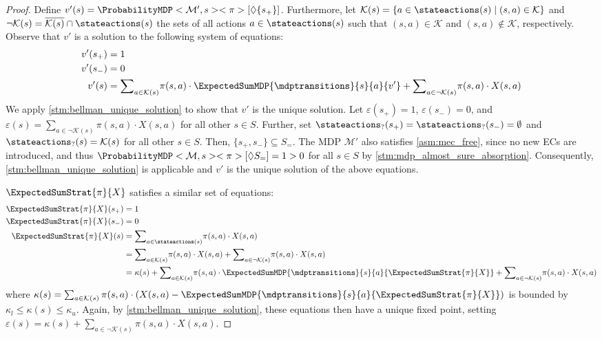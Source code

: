 \documentclass{theoretics}
\newcommand{\intersectionSym}{\cap}
\newcommand{\intersectionBin}{\mathbin{\intersectionSym}}
\newcommand{\intersection}{\intersectionBin}
\newcommand{\MDP}{\mathcal{M}}
\newcommand{\States}{S}
\newcommand{\strategy}{\pi}
\newcommand{\reach}{\Diamond}
\newcommand{\targetstate}{s_+}
\newcommand{\sinkstate}{s_-}
\begin{document}
\begin{proof}
	Define $v'(s) = \ProbabilityMDP<\MDP', s><\strategy>[\reach \{\targetstate\}]$.
	Furthermore, let $\mathcal{K}(s) = \{a \in \stateactions(s) \mid (s, a) \in \mathcal{K}\}$ and $\lnot \mathcal{K}(s) = \overline{\mathcal{K}(s)} \intersection \stateactions(s)$ the sets of all actions $a \in \stateactions(s)$ such that $(s, a) \in \mathcal{K}$ and $(s, a) \notin \mathcal{K}$, respectively.
	Observe that $v'$ is a solution to the following system of equations:
	\begin{align*}
		v'(\targetstate) & = 1 \\
		v'(\sinkstate) & = 0 \\
		v'(s) & = {\sum}_{a \in \mathcal{K}(s)} \strategy(s, a) \cdot \ExpectedSumMDP{\mdptransitions}{s}{a}{v'} + {\sum}_{a \in \lnot \mathcal{K}(s)} \strategy(s, a) \cdot X(s, a)
	\end{align*}
	We apply \cref{stm:bellman_unique_solution} to show that $v'$ is the unique solution.
	Let $\varepsilon(\targetstate) = 1$, $\varepsilon(\sinkstate) = 0$, and $\varepsilon(s) = {\sum}_{a \in \lnot \mathcal{K}(s)} \strategy(s, a) \cdot X(s, a)$ for all other $s \in \States$.
	Further, set $\stateactions_?(\targetstate) = \stateactions_?(\sinkstate) = \emptyset$ and $\stateactions_?(s) = \mathcal{K}(s)$ for all other $s \in \States$.
	Then, $\{\targetstate, \sinkstate\} \subseteq \States_=$.
	The MDP $\MDP'$ also satisfies \cref{asm:mec_free}, since no new ECs are introduced, and thus $\ProbabilityMDP<\MDP, s><\strategy>[\reach \States_=] = 1 > 0$ for all $s \in \States$ by \cref{stm:mdp_almost_sure_absorption}.
	Consequently, \cref{stm:bellman_unique_solution} is applicable and $v'$ is the unique solution of the above equations.

	$\ExpectedSumStrat{\strategy}{X}$ satisfies a similar set of equations:
	\begin{align*}
		\ExpectedSumStrat{\strategy}{X}(\targetstate) & = 1 \\
		\ExpectedSumStrat{\strategy}{X}(\sinkstate) & = 0 \\
		\ExpectedSumStrat{\strategy}{X}(s) & = {\sum}_{a \in \stateactions(s)} \strategy(s, a) \cdot X(s, a) \\
			& = {\sum}_{a \in \mathcal{K}(s)} \strategy(s, a) \cdot X(s, a) + {\sum}_{a \in \lnot \mathcal{K}(s)} \strategy(s, a) \cdot X(s, a) \\
			& = \kappa(s) + {\sum}_{a \in \mathcal{K}(s)} \strategy(s, a) \cdot \ExpectedSumMDP{\mdptransitions}{s}{a}{\ExpectedSumStrat{\strategy}{X}} + {\sum}_{a \in \lnot \mathcal{K}(s)} \strategy(s, a) \cdot X(s, a)
	\end{align*}
	where $\kappa(s) = \sum_{a \in \mathcal{K}(s)} \strategy(s, a) \cdot (X(s, a) - \ExpectedSumMDP{\mdptransitions}{s}{a}{\ExpectedSumStrat{\strategy}{X}})$ is bounded by $\kappa_l \leq \kappa(s) \leq \kappa_u$.
	Again, by \cref{stm:bellman_unique_solution}, these equations then have a unique fixed point, setting $\varepsilon(s) = \kappa(s) + {\sum}_{a \in \lnot \mathcal{K}(s)} \strategy(s, a) \cdot X(s, a)$.


\end{proof}
\end{document}
